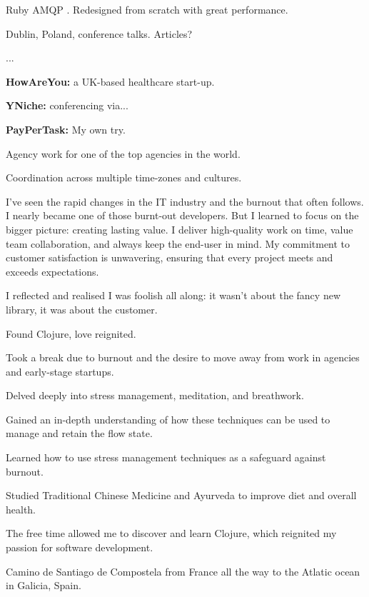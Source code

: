 \startitemize
  \item Ruby AMQP . Redesigned from scratch with great performance.
  \item Dublin, Poland, conference talks. Articles?
  \item ...
\stopitemize

\startitemize
  \item {\bf HowAreYou:} a UK-based healthcare start-up.
  \item {\bf YNiche:} conferencing via...
  \item {\bf PayPerTask:} My own try.
\stopitemize

\startitemize
  \item Agency work for one of the top agencies in the world.
  \item Coordination across multiple time-zones and cultures.
\stopitemize

\vskip -5mm
I’ve seen the rapid changes in the IT industry and the burnout that often follows. I nearly became one of those burnt-out developers. But I learned to focus on the bigger picture: creating lasting value. I deliver high-quality work on time, value team collaboration, and always keep the end-user in mind. My commitment to customer satisfaction is unwavering, ensuring that every project meets and exceeds expectations.

I reflected and realised I was foolish all along: it wasn't about the fancy new library, it was about the customer.

Found Clojure, love reignited.

\startitemize[before={}, after={}]
  \item Took a break due to burnout and the desire to move away from work in agencies and early-stage startups.
  \item Delved deeply into stress management, meditation, and breathwork.
  \item Gained an in-depth understanding of how these techniques can be used to manage and retain the flow state.
  \item Learned how to use stress management techniques as a safeguard against burnout.
  \item Studied Traditional Chinese Medicine and Ayurveda to improve diet and overall health.
  \item The free time allowed me to discover and learn Clojure, which reignited my passion for software development.
  \item Camino de Santiago de Compostela from France all the way to the Atlatic ocean in Galicia, Spain.
\stopitemize


